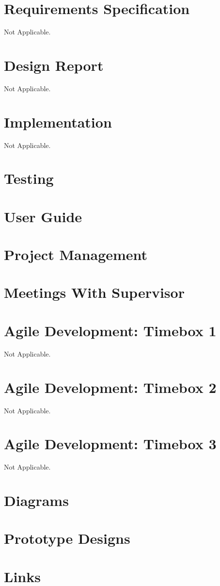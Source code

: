 \documentclass[a4paper,12pt]{report}
\begin{document}
\chapter{Requirements Specification}
Not Applicable.
\chapter{Design Report}
Not Applicable.
\chapter{Implementation}
Not Applicable.
\chapter{Testing}

\chapter{User Guide}

\chapter{Project Management}

\chapter{Meetings With Supervisor}

\chapter{Agile Development: Timebox 1}
Not Applicable.
\chapter{Agile Development: Timebox 2}
Not Applicable.
\chapter{Agile Development: Timebox 3}
Not Applicable.
\chapter{Diagrams}

\chapter{Prototype Designs}

\chapter{Links}


\glsaddallunused
\end{document}
